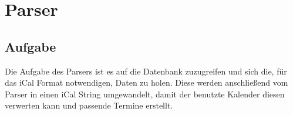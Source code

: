 
\renewcommand{\theauthor}{Dario Wagner}
\chapter{Parser}
\label{sec:parser}
\section{Aufgabe}
\label{sec:parser-aufgabe}
Die Aufgabe des Parsers ist es auf die Datenbank zuzugreifen und sich die, für das iCal Format notwendigen, Daten zu holen. Diese werden anschließend vom Parser in einen iCal String umgewandelt, damit der benutzte Kalender diesen verwerten kann und passende Termine erstellt. 

